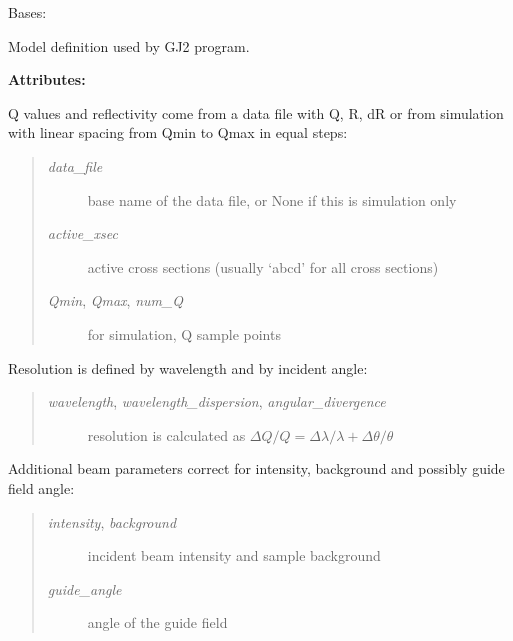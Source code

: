 \documentclass[letterpaper,10pt,english]{sphinxmanual}
\begin{document}
\begin{fulllineitems}
\label{api/staj:refl1d.staj.MlayerMagnetic}
Bases: 

Model definition used by GJ2 program.

\textbf{Attributes:}

Q values and reflectivity come from a data file with Q, R, dR or
from simulation with linear spacing from Qmin to Qmax in equal steps:
\begin{quote}
\begin{description}
\item[{\emph{data\_file}}] \leavevmode
base name of the data file, or None if this is simulation only

\item[{\emph{active\_xsec}}] \leavevmode
active cross sections (usually `abcd' for all cross sections)

\item[{\emph{Qmin}, \emph{Qmax}, \emph{num\_Q}}] \leavevmode
for simulation, Q sample points

\end{description}
\end{quote}

Resolution is defined by wavelength and by incident angle:
\begin{quote}
\begin{description}
\item[{\emph{wavelength}, \emph{wavelength\_dispersion}, \emph{angular\_divergence}}] \leavevmode
resolution is calculated as
$\Delta Q/Q = \Delta\lambda/\lambda + \Delta\theta/\theta$

\end{description}
\end{quote}

Additional beam parameters correct for intensity, background and
possibly guide field angle:
\begin{quote}
\begin{description}
\item[{\emph{intensity}, \emph{background}}] \leavevmode
incident beam intensity and sample background

\item[{\emph{guide\_angle}}] \leavevmode
angle of the guide field

\end{description}
\end{quote}


\end{fulllineitems}
\end{document}

